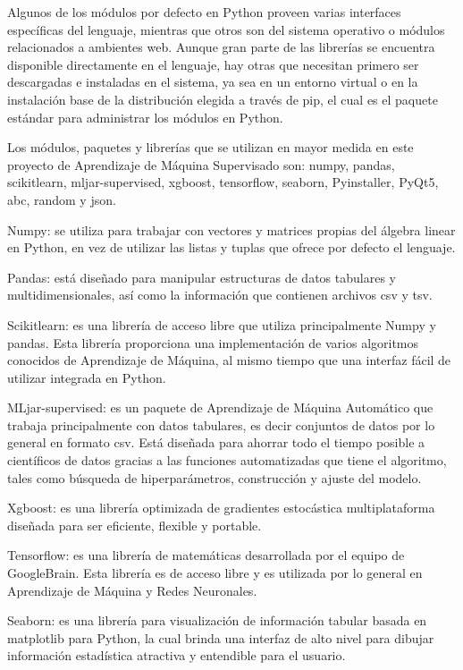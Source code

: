 Algunos de los módulos por defecto en Python proveen varias interfaces específicas del lenguaje, mientras que otros son del sistema operativo o módulos relacionados a ambientes web. Aunque gran parte de las librerías se encuentra disponible directamente en el lenguaje, hay otras que necesitan primero ser descargadas e instaladas en el sistema, ya sea en un entorno virtual o en la instalación base de la distribución elegida a través de pip, el cual es el paquete estándar para administrar los módulos en Python.

Los módulos, paquetes y librerías que se utilizan en mayor medida en este proyecto de Aprendizaje de Máquina Supervisado son: numpy, pandas, scikitlearn, mljar-supervised, xgboost, tensorflow, seaborn, Pyinstaller, PyQt5, abc, random y json. 

\begin{APAitemize}
    \item Numpy: se utiliza para trabajar con vectores y matrices propias del álgebra linear en Python, en vez de utilizar las listas y tuplas que ofrece por defecto el lenguaje.
    \item Pandas: está diseñado para manipular estructuras de datos tabulares y multidimensionales, así como la información que contienen archivos csv y tsv.
    \item Scikitlearn: es una librería de acceso libre que utiliza principalmente Numpy y pandas. Esta librería proporciona una implementación de varios algoritmos conocidos de Aprendizaje de Máquina, al mismo tiempo que una interfaz fácil de utilizar integrada en Python.
    \item MLjar-supervised: es un paquete de Aprendizaje de Máquina Automático que trabaja principalmente con datos tabulares, es decir conjuntos de datos por lo general en formato csv. Está diseñada para ahorrar todo el tiempo posible a científicos de datos gracias a las funciones automatizadas que tiene el algoritmo, tales como búsqueda de hiperparámetros, construcción y ajuste del modelo.
    \item Xgboost: es una librería optimizada de gradientes estocástica multiplataforma diseñada para ser eficiente, flexible y portable.
    \item Tensorflow: es una librería de matemáticas desarrollada por el equipo de GoogleBrain. Esta librería es de acceso libre y es utilizada por lo general en Aprendizaje de Máquina y Redes Neuronales.
    \item Seaborn: es una librería para visualización de información tabular basada en matplotlib para Python, la cual brinda una interfaz de alto nivel para dibujar información estadística atractiva y entendible para el usuario.

\end{APAitemize}

